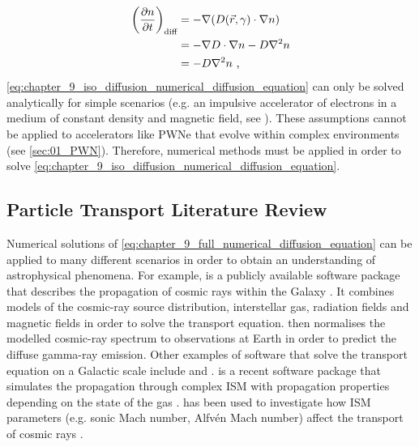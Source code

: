 \begin{equation}
    \begin{aligned}
    \qty(\pdv{n}{t})_\text{diff}&=-\nabla\qty(D\qty(\vec{r},\gamma)\cdot \nabla n)  \\
    &=-\nabla D\cdot \nabla n -D\nabla^2 n \\
    &=-D\nabla^2 n\text{ ,} 
    \end{aligned}
\end{equation}
\noindent \autoref{eq:chapter_9_iso_diffusion_numerical_diffusion_equation} can only be solved analytically for simple scenarios (e.g. an impulsive accelerator of electrons in a medium of constant density and magnetic field, see \cite{1995PhRvD..52.3265A}). These assumptions cannot be applied to accelerators like PWNe that evolve within complex environments (see \autoref{sec:01_PWN}). Therefore, numerical methods must be applied in order to solve \autoref{eq:chapter_9_iso_diffusion_numerical_diffusion_equation}.

\subsection{Particle Transport Literature Review}

Numerical solutions of \autoref{eq:chapter_9_full_numerical_diffusion_equation} can be applied to many different scenarios in order to obtain an understanding of astrophysical phenomena. For example, \galprop is a publicly available software package that describes the propagation of cosmic rays within the Galaxy \citep{2022ApJS..262...30P}. It combines models of the cosmic-ray source distribution, interstellar gas, radiation fields and magnetic fields in order to solve the transport equation. \galprop then normalises the modelled cosmic-ray spectrum to observations at Earth in order to predict the diffuse gamma-ray emission. Other examples of software that solve the transport equation on a Galactic scale include \dragon \citep{2017JCAP...02..015E} and \picard \citep{2014APh....55...37K}. \criptic is a recent software package that simulates the propagation through complex ISM with propagation properties depending on the state of the gas \citep{2022MNRAS.517.1355K}. \criptic has been used to investigate how ISM parameters (e.g. sonic Mach number, Alfv\'en Mach number) affect the transport of cosmic rays \citep{2023MNRAS.519.1503S}.

